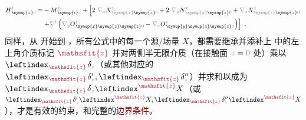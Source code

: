 \begin{subequations}
\begin{align}
	H^{\;\!\mathcolor{gray}{t}}_{\;\! \symup{z} \mathcolor{gray}{0}} = & - M^{\;\!\mathcolor{gray}{t}}_{\;\! \symup{\iota} \mathcolor{gray}{z}} + \left[ 2~ \mathcolor{gray}{\nabla_x}
	N^{\;\!\mathcolor{gray}{t}}_{\;\! \mathcolor{gray}{\symup{x}}\symup{z} \mathcolor{gray}{0}} + 2~ \mathcolor{gray}{\nabla_y} N^{\;\!\mathcolor{gray}{t}}_{\;\! \mathcolor{gray}{\symup{y}} \symup{z} \mathcolor{gray}{0}} + \mathcolor{gray}{\nabla_z} N^{\;\!\mathcolor{gray}{t}}_{\;\! \mathcolor{gray}{\symup{z}} \symup{z} \mathcolor{gray}{0}} \right. \label{eq:H_z0=} \\ & \left. + \mathcolor{gray}{\nabla^t} \left( \mathcolor{gray}{\nabla_y}
	O^{\;\!\mathcolor{gray}{t}}_{\;\! \symup{x}\symup{z}\symup{z} \mathcolor{gray}{0}} - \mathcolor{gray}{\nabla_x}
	O^{\;\!\mathcolor{gray}{t}}_{\;\! \symup{y}\symup{z}\symup{z}\mathcolor{gray}{0}} \right) \right]~.
\end{align}
\end{subequations}
同样，从  开始到 ，所有公式中的每一个源/\textcolor{NavyBlue}{场量} $X$，都需要继承并添补上  中的左上角介质标记 $\textcolor{Maroon}{\mathsfit{z}}$ 并对两侧半无限介质（在接触面 $\mathcolor{gray}{z \mathcolor{black}{=} 0}$ 处）乘以 $\leftindex_{\textcolor{Maroon}{\mathsfit{z}}} \;\! \delta_{\mathcolor{gray}{z}}$（或其他对应的 $\leftindex_{\textcolor{Maroon}{\mathsfit{z}}} \;\! \delta'_{\mathcolor{gray}{z}},\leftindex_{\textcolor{Maroon}{\mathsfit{z}}} \;\! \delta''_{\mathcolor{gray}{z}}$）并求和以成为 $\leftindex_{\textcolor{Maroon}{\mathsfit{z}}} \;\! \delta_{\mathcolor{gray}{z}} \leftindex^{\textcolor{Maroon}{\mathsfit{z}}} X$（或 $\leftindex_{\textcolor{Maroon}{\mathsfit{z}}} \;\! \delta'_{\mathcolor{gray}{z}} \leftindex^{\textcolor{Maroon}{\mathsfit{z}}} X,\leftindex_{\textcolor{Maroon}{\mathsfit{z}}} \;\! \delta''_{\mathcolor{gray}{z}} \leftindex^{\textcolor{Maroon}{\mathsfit{z}}} X$），才是有效的约束，和完整的\textcolor{Maroon}{边界条件}。

